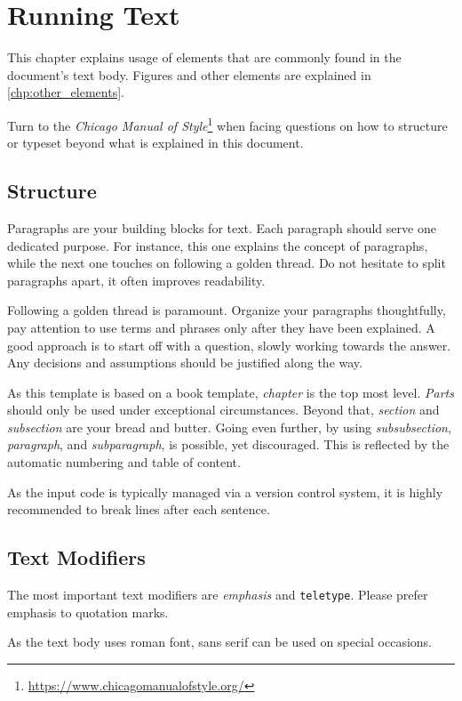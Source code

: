 \chapter{Running Text}
\label{chp:running_text}

This chapter explains usage of elements that are commonly found in the document's text body.
Figures and other elements are explained in \cref{chp:other_elements}.

Turn to the \emph{Chicago Manual of Style}\footnote{\url{https://www.chicagomanualofstyle.org/}} when facing questions on how to structure or typeset beyond what is explained in this document.

\section{Structure}

Paragraphs are your building blocks for text.
Each paragraph should serve one dedicated purpose.
For instance, this one explains the concept of paragraphs, while the next one touches on following a golden thread.
Do not hesitate to split paragraphs apart, it often improves readability.

Following a golden thread is paramount.
Organize your paragraphs thoughtfully, pay attention to use terms and phrases only after they have been explained.
A good approach is to start off with a question, slowly working towards the answer.
Any decisions and assumptions should be justified along the way.

As this template is based on a book template, \emph{chapter} is the top most level.
\emph{Parts} should only be used under exceptional circumstances.
Beyond that, \emph{section} and \emph{subsection} are your bread and butter.
Going even further, by using \emph{subsubsection}, \emph{paragraph}, and \emph{subparagraph}, is possible, yet discouraged.
This is reflected by the automatic numbering and table of content.

As the input code is typically managed via a version control system, it is highly recommended to break lines after each sentence.

\section{Text Modifiers}

The most important text modifiers are \emph{emphasis} and \texttt{teletype}.
Please prefer emphasis to quotation marks.

As the text body uses roman font, \textsf{sans serif} can be used on special occasions.


